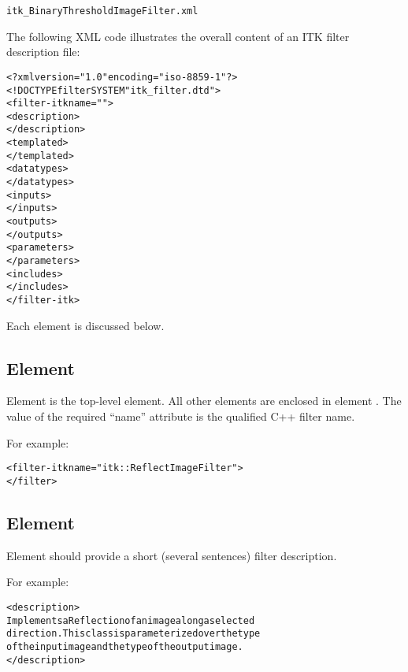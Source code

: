 \begin{alltt}
  itk\_BinaryThresholdImageFilter.xml
\end{alltt}


The following XML code illustrates the overall content of an ITK
filter description file:

\begin{alltt}
  <?xml version="1.0" encoding="iso-8859-1"?>
  <!DOCTYPE filter SYSTEM "itk_filter.dtd">
  <filter-itk name="">
     <description>
     \velide
     </description>
     <templated>
     \velide
     </templated>
     <datatypes>
     \velide
     </datatypes>
     <inputs>
     \velide
     </inputs>
     <outputs>
     \velide
     </outputs>
     <parameters>
     \velide
     </parameters>
     <includes>
     \velide   
     </includes>
  </filter-itk>
\end{alltt}

Each element is discussed below.

\subsection{Element }
\label{sec:itk_mods:filter-itk_element}

Element  is the top-level element.  All other
elements are enclosed in element . The value
of the required ``name'' attribute is the qualified C++ filter name.

For example:

\begin{alltt}
  <filter-itk name="itk::ReflectImageFilter">
    \velide
  </filter>
\end{alltt}

\subsection{Element }
\label{sec:itk_mods:descr_element}

Element  should provide a short (several sentences)
filter description.  

For example:

\begin{alltt}
  <description>
    Implements a Reflection of an image along a selected 
    direction. This class is parameterized over the type 
    of the input image and the type of the output image. 
  </description>
\end{alltt}



